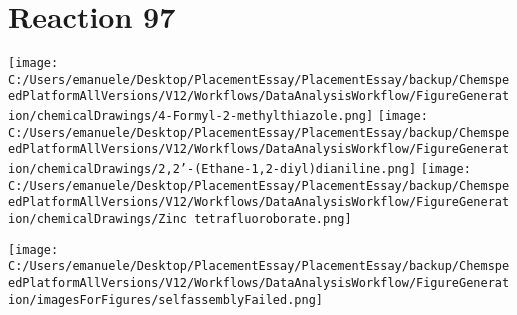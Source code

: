 \documentclass{article}%
\begin{document}
\section*{Reaction 97}%
%
\begin{scheme}[H]%
\begin{minipage}{0.5\textwidth}%
\texttt{[image: C:/Users/emanuele/Desktop/PlacementEssay/PlacementEssay/backup/ChemspeedPlatformAllVersions/V12/Workflows/DataAnalysisWorkflow/FigureGeneration/chemicalDrawings/4-Formyl-2-methylthiazole.png]}%
\texttt{[image: C:/Users/emanuele/Desktop/PlacementEssay/PlacementEssay/backup/ChemspeedPlatformAllVersions/V12/Workflows/DataAnalysisWorkflow/FigureGeneration/chemicalDrawings/2,2'-(Ethane-1,2-diyl)dianiline.png]}%
\texttt{[image: C:/Users/emanuele/Desktop/PlacementEssay/PlacementEssay/backup/ChemspeedPlatformAllVersions/V12/Workflows/DataAnalysisWorkflow/FigureGeneration/chemicalDrawings/Zinc tetrafluoroborate.png]}%
\end{minipage}%
\begin{minipage}{0.5\textwidth}%
\begin{center}%
\texttt{[image: C:/Users/emanuele/Desktop/PlacementEssay/PlacementEssay/backup/ChemspeedPlatformAllVersions/V12/Workflows/DataAnalysisWorkflow/FigureGeneration/imagesForFigures/selfassemblyFailed.png]}%
\end{center}%
\end{minipage}%
\caption{Self-assembly of components 1, 20, with Zinc(II) in a 3.0:1.5:1.0 molar ratio in CH$_3$CN at 60\textdegree C for 40h. These are the reagents (starting materials) for reaction 97.}%
\end{scheme}%
\end{document}
